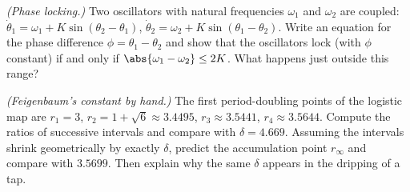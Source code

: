 \begin{problems}
 \emph{(Phase locking.)} Two oscillators with natural frequencies $\omega_1$ and $\omega_2$ are coupled: $\dot\theta_1 = \omega_1 + K\sin(\theta_2-\theta_1)$, $\dot\theta_2 = \omega_2 + K\sin(\theta_1 - \theta_2)$. Write an equation for the phase difference $\phi = \theta_1 - \theta_2$ and show that the oscillators lock (with $\phi$ constant) if and only if $\abs{\omega_1-\omega_2}\le2K$. What happens just outside this range?

 \emph{(Feigenbaum's constant by hand.)} The first period-doubling points of the logistic map are $r_1 = 3$, $r_2 = 1+\sqrt6\approx3.4495$, $r_3\approx3.5441$, $r_4\approx3.5644$. Compute the ratios of successive intervals and compare with $\delta = 4.669$. Assuming the intervals shrink geometrically by exactly $\delta$, predict the accumulation point $r_\infty$ and compare with $3.5699$. Then explain why the same $\delta$ appears in the dripping of a tap.
\end{problems}

\begin{reading}
\end{reading}

